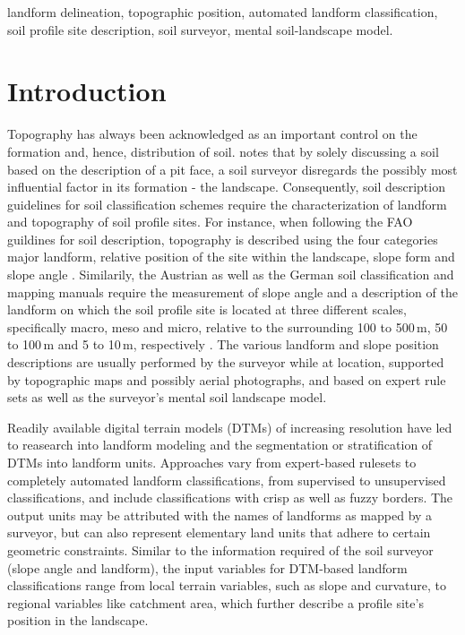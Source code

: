 \documentclass[preprint,12pt,authoryear]{elsarticle}
\begin{document}
\begin{frontmatter}
\begin{abstract}
\end{abstract}

\begin{keyword}
landform delineation, topographic position, automated landform classification, soil profile site description, soil surveyor, mental soil-landscape model.
\end{keyword}

\end{frontmatter}

\linenumbers

\section{Introduction}
Topography has always been acknowledged as an important control on the formation and, hence, distribution of soil. \cite{Schaetzl2013} notes that by solely discussing a soil based on the description of a pit face, a soil surveyor disregards the possibly most influential factor in its formation - the landscape.	Consequently, soil description guidelines for soil classification schemes require the characterization of landform and topography of soil profile sites. For instance, when following the FAO guildines for soil description, topography is described using the four categories major landform, relative position of the site within the landscape, slope form and slope angle \citep{FAO2006}. Similarily, the Austrian \citep{Nestroy2011} as well as the German soil classification and mapping manuals \citep{ArbeitsgruppeBoden2006} require the measurement of slope angle and a description of the landform on which the soil profile site is located at three different scales, specifically macro, meso and micro, relative to the surrounding 100 to 500\,m, 50 to 100\,m and 5 to 10\,m, respectively \citep{Englisch1998}. The various landform and slope position descriptions are usually performed by the surveyor while at location, supported by topographic maps and possibly aerial photographs, and based on expert rule sets as well as the surveyor's mental soil landscape model. 

Readily available digital terrain models (DTMs) of increasing resolution have led to reasearch into landform modeling and the segmentation or stratification  of DTMs into landform units. Approaches vary from expert-based rulesets to completely automated landform classifications, from supervised to unsupervised classifications, and include classifications with crisp as well as fuzzy borders.  The output units may be attributed with the names of landforms as mapped by a surveyor, but can also represent elementary land units that adhere to certain geometric constraints. Similar to the information required of the soil surveyor (slope angle and landform), the input variables for DTM-based landform classifications range from local terrain variables, such as slope and curvature, to regional variables like catchment area, which further describe a profile site's position in the landscape.
\end{document}
